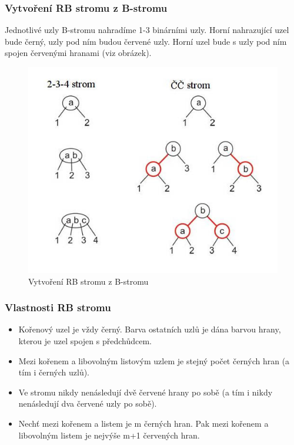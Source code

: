\documentclass[10pt,a4paper]{article}
\begin{document}
\subsubsection{Vytvoření RB stromu z B-stromu}
Jednotlivé uzly B-stromu nahradíme 1-3 binárními uzly. Horní nahrazující uzel bude černý, uzly pod ním budou červené uzly. Horní uzel bude s uzly pod ním spojen červenými hranami (viz obrázek).
\begin{figure}[h]
    \centering
    \includegraphics[scale=0.5]{img/RBstrom}
    \caption{Vytvoření RB stromu z B-stromu}
    \label{fig:rb_strom_z_b_stromu}
\end{figure}
\subsubsection{Vlastnosti RB stromu}
\begin{itemize}
	\item Kořenový uzel je vždy černý. Barva ostatních uzlů je dána barvou hrany, kterou je uzel spojen s předchůdcem.
	\item Mezi kořenem a libovolným listovým uzlem je stejný počet černých hran (a tím i černých uzlů).
	\item Ve stromu nikdy nenásledují dvě červené hrany po sobě (a tím i nikdy nenásledují dva červené uzly po sobě).
	\item Nechť mezi kořenem a listem je m černých hran. Pak mezi kořenem a libovolným listem je nejvýše m+1 červených hran.
\end{itemize}
\end{document}
